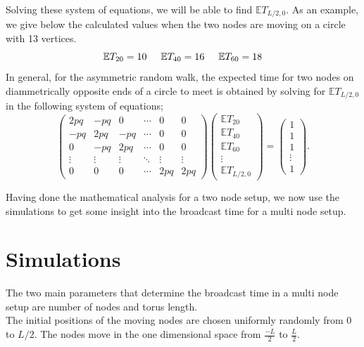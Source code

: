 \documentclass[a4paper,10pt,english]{article}
\begin{document}
Solving these system of equations, we will be able to find $\mathbb{E}T_{L/2,0}$. As an example, we give below the calculated values when the two nodes are moving on a circle with 13 vertices.
\begin{equation*}
\mathbb{E}T_{20}=10 \hspace{.5cm} \mathbb{E}T_{40}=16 \hspace{.5cm} \mathbb{E}T_{60}=18
\end{equation*}
In general, for the asymmetric random walk, the expected time for two nodes on diammetrically opposite ends of a circle to meet is obtained by solving for $\mathbb{E}T_{L/2,0}$ in the following system of equations;
\begin{equation}
\begin{pmatrix}
2pq & -pq & 0 & \cdots & 0 & 0\\
-pq & 2pq & -pq & \cdots & 0  & 0\\
0 &-pq & 2pq & \cdots & 0 & 0\\
\vdots  & \vdots & \vdots & \ddots & \vdots & \vdots \\
0 & 0 & 0 & \cdots & 2pq & 2pq 
\end{pmatrix}
\begin{pmatrix}
\mathbb{E}T_{20}\\
\mathbb{E}T_{40}\\
\mathbb{E}T_{60}\\
\vdots\\
\mathbb{E}T_{L/2,0}
\end{pmatrix}
=
\begin{pmatrix}
1\\
1\\
1\\
\vdots\\
1
\end{pmatrix}.
\end{equation}

Having done the mathematical analysis for a two node setup, we now use the simulations to get some insight into the broadcast time for a multi node setup.

\section{Simulations}\label{sim}
The two main parameters that determine the broadcast time in a multi node setup are number of nodes and torus length.\\
The initial positions of the moving nodes are chosen uniformly randomly from $0$ to $L/2$. The nodes move in the one dimensional space from $\frac{-L}{2}$ to $\frac{L}{2}$.
\end{document}
